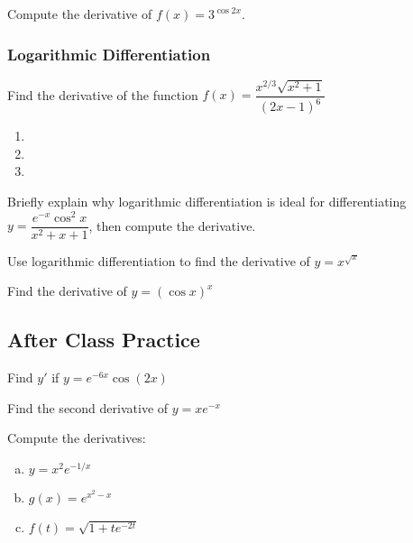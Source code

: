 \documentclass[notes]{subfiles}
\begin{document}
		\begin{ex}
			Compute the derivative of \(f(x) = 3^{\cos 2x}\).
		\end{ex}
			\newpage
			
	\subsubsection*{Logarithmic Differentiation}

		\begin{ex}
			Find the derivative of the function \(f(x) = \dfrac{x^{2/3}\sqrt{x^2+1}}{(2x-1)^6}\)
		\end{ex}	
		
		\begin{rmk}
			\begin{enumerate}
				\setlength\itemsep{30pt}
				\item 
				\item 
				\item 
			\end{enumerate}
		\end{rmk}
			\newpage
			
		\begin{ex}
			Briefly explain why logarithmic differentiation is ideal for differentiating \(y = \dfrac{e^{-x}\cos^2x}{x^2+x+1}\), then compute the derivative.
		\end{ex}
			
		\begin{ex}
			Use logarithmic differentiation to find the derivative of \(y = x^{\sqrt{x}}\)
		\end{ex}
		
		\begin{ex}
			Find the derivative of \(y = (\cos x)^x\)
		\end{ex}
			\newpage
			
	\subsection*{After Class Practice}	
		\begin{ex}
			Find \(y'\) if \(y = e^{-6x}\cos(2x)\)
		\end{ex}
			
		\begin{ex}
			Find the second derivative of \(y = xe^{-x}\)
		\end{ex}
			
		\begin{ex}
			Compute the derivatives:
			\begin{enumerate}[(a)]
				\item \(y = x^2e^{-1/x}\)
					
				\item \(g(x) = e^{x^2-x}\)
					
				\item \(f(t) = \sqrt{1+te^{-2t}}\)
			\end{enumerate}
		\end{ex}
			\newpage
			
\end{document}
